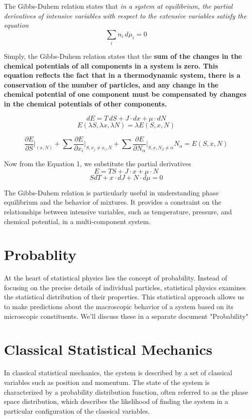 \documentclass{article}
\begin{document}
The Gibbs-Duhem relation states that \textit{in a system at equilibrium, the partial derivatives of intensive variables with respect to the extensive variables satisfy the equation}
\large
$$\sum_{i} n_{i} \, d\mu_{i}=0$$

Simply, the Gibbs-Duhem relation states that the \textbf{sum of the changes in the chemical potentials of all components in a system is zero. This equation reflects the fact that in a thermodynamic system, there is a conservation of the number of particles, and any change in the chemical potential of one component must be compensated by changes in the chemical potentials of other components.}

$$dE = T \, dS + J \cdot dx + \mu \cdot dN $$
$$E(\lambda S, \lambda x, \lambda N) = \lambda E(S, x, N)$$

$$\frac{{\partial E}}{{\partial S}} \Bigg|_{(x, N)}+\sum \frac{{\partial E}}{{\partial x_i}} \Bigg|_{S, x_j \neq x_i, N}+\sum \frac{{\partial E}}{{\partial N_\alpha}} \Bigg|_{S,x,N_\beta \neq \alpha} N_\alpha=E(S, x, N)
$$



Now from the Equation 1, we substitute the partial derivatives
$$E = TS + J \cdot x + \mu \cdot N$$
$$SdT + x \cdot dJ + N \cdot d\mu = 0$$



The Gibbs-Duhem relation is particularly useful in understanding phase equilibrium and the behavior of mixtures. It provides a constraint on the relationships between intensive variables, such as temperature, pressure, and chemical potential, in a multi-component system.

\section{Probablity}
At the heart of statistical physics lies the concept of probability. Instead of focusing on the precise details of individual particles, statistical physics examines the statistical distribution of their properties. This statistical approach allows us to make predictions about the macroscopic behavior of a system based on its microscopic constituents.
We'll discuss these in a separate document "Probability"

\section{Classical Statistical Mechanics}
In classical statistical mechanics, the system is described by a set of classical variables such as position and momentum. The state of the system is characterized by a probability distribution function, often referred to as the phase space distribution, which describes the likelihood of finding the system in a particular configuration of the classical variables.
\end{document}
